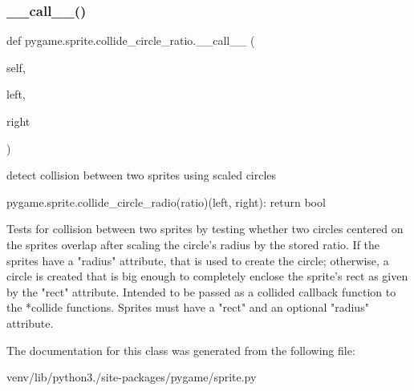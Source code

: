 \subsubsection{\texorpdfstring{\+\_\+\+\_\+call\+\_\+\+\_\+()}{\_\_call\_\_()}}
{\footnotesize\ttfamily def pygame.\+sprite.\+collide\+\_\+circle\+\_\+ratio.\+\_\+\+\_\+call\+\_\+\+\_\+ (\begin{DoxyParamCaption}\item[{}]{self,  }\item[{}]{left,  }\item[{}]{right }\end{DoxyParamCaption})}

\begin{DoxyVerb}detect collision between two sprites using scaled circles

pygame.sprite.collide_circle_radio(ratio)(left, right): return bool

Tests for collision between two sprites by testing whether two circles
centered on the sprites overlap after scaling the circle's radius by
the stored ratio. If the sprites have a "radius" attribute, that is
used to create the circle; otherwise, a circle is created that is big
enough to completely enclose the sprite's rect as given by the "rect"
attribute. Intended to be passed as a collided callback function to the
*collide functions. Sprites must have a "rect" and an optional "radius"
attribute.\end{DoxyVerb}
 

The documentation for this class was generated from the following file\+:\begin{DoxyCompactItemize}
\item 
venv/lib/python3./site-\/packages/pygame/sprite.\+py\end{DoxyCompactItemize}

